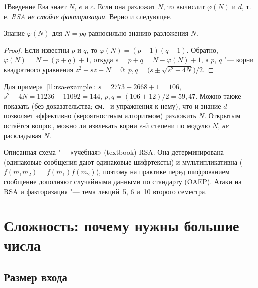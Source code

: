 \begin{lecture}{1}{Введение}
Ева знает $N$, $e$ и $c$. Если она разложит $N$, то вычислит $\varphi(N)$ и $d$, т.\,е.
\emph{RSA не стойче факторизации}. Верно и следующее.

\begin{proposition}\label{l1:phi-factor}
Знание $\varphi(N)$ для $N = pq$ равносильно знанию разложения $N$.
\end{proposition}

\begin{proof}
Если известны $p$ и $q$, то $\varphi(N) = (p - 1)(q - 1)$. Обратно, $\varphi(N) = N - (p + q) +
1$, откуда $s = p + q = N - \varphi(N) + 1$, а $p$, $q$ "--- корни квадратного уравнения
$z^2 - sz + N = 0$: $p, q = \bigl(s \pm \sqrt{s^2 - 4N}\bigr)/2$.
\end{proof}

Для примера~\ref{l1:rsa-example}: $s = 2773 - 2668 + 1 = 106$, $s^2 - 4N = 11236 - 11092 = 144$,
$p, q = (106 \pm 12)/2 = 59, 47$. Можно также показать (без доказательства;
см.~\cite[разд.~3.2]{hps} и упражнения к нему), что и знание $d$ позволяет эффективно
(вероятностным алгоритмом) разложить $N$. Открытым остаётся вопрос, можно ли извлекать корни
$e$-й степени по модулю $N$, \emph{не} раскладывая $N$.

\begin{remark}
Описанная схема "--- «учебная» (textbook) RSA. Она детерминирована (одинаковые сообщения
дают одинаковые шифртексты) и мультипликативна ($f(m_1 m_2) = f(m_1) f(m_2)$), поэтому на
практике перед шифрованием сообщение дополняют случайными данными по стандарту (OAEP).
Атаки на RSA и факторизация "--- тема лекций~5, 6 и~10 второго семестра.
\end{remark}



\section{Сложность: почему нужны большие числа}\label{l1:complexity}

\subsection{Размер входа}


\end{lecture}
